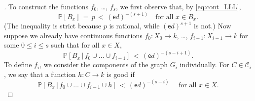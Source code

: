 \documentclass[11pt,reqno,psamsfonts]{amsart}
\theoremstyle{bfnote}
\theoremstyle{definition}
\theoremstyle{remark}
\newcommand{\0}{\varnothing}
\newcommand{\set}[1]{\{#1\}}
\renewcommand{\P}{\mathbb{P}}
\renewcommand{\leq}{\leqslant}
\renewcommand{\geq}{\geqslant}
\newcommand{\defeq}{\coloneqq}
\newcommand{\emphd}[1]{{\fontseries{b}\selectfont\textsf{#1}}}
\newcommand{\Sch}{\mathsf{Sch}}
\numberwithin{equation}{section}
\newenvironment{scproof}[1][]{\begin{proof}[\textsc{\upshape{Proof}}#1]}{\end{proof}}
\begin{document}
\begin{scproof}
        To construct the functions $f_0$, \ldots, $f_s$, we first observe that, by \eqref{eq:cont_LLL}, 
        \[
            \P[B_x] \,=\, p \,<\, (\mathsf{e} d)^{-(s+1)} \quad \text{for all } x \in B_x.
        \]
        (The inequality is strict because $p$ is rational, while $(\mathsf{e}d)^{s+1}$ is not.) Now suppose we already have continuous functions $f_0 \colon X_0 \to k$, \ldots, $f_{i-1} \colon X_{i-1} \to k$ for some $0 \leq i \leq s$ such that for all $x \in X$,
        \begin{equation}\label{eq:ind}
            \P[B_x \,\vert\, f_0 \cup \ldots \cup f_{i-1}] \,<\, (\mathsf{e}d)^{-(s-i+1)}.
        \end{equation}
        To define $f_i$, we consider the components of the graph $G_i$ individually. For $C \in \mathcal{C}_i$, we say that a function $h \colon C \to k$ is \emphd{good} if%
        \[
                \P[B_x \,\vert\, f_0 \cup \ldots \cup f_{i-1} \cup h] \,<\, (\mathsf{e}d)^{-(s-i)} \quad \text{ for all } x \in X.
            \]
        

\end{scproof}
\end{document}

